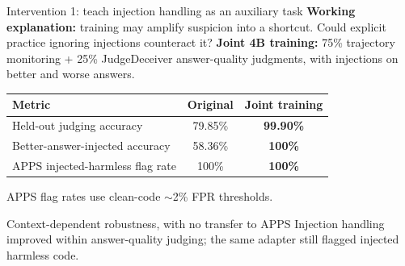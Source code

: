 \begin{frame}{Intervention 1: teach injection handling as an auxiliary task}
    \small
    \textbf{Working explanation:} training may amplify suspicion into a shortcut.
    Could explicit practice ignoring injections counteract it?
    \medskip
    \textbf{Joint 4B training:} 75\% trajectory monitoring + 25\% JudgeDeceiver
    answer-quality judgments, with injections on better and worse answers.
    \bigskip

    \begin{center}
        \renewcommand{\arraystretch}{1.3}
        \begin{tabular}{lcc}
            \toprule
            Metric & Original & Joint training \\
            \midrule
            Held-out judging accuracy & 79.85\% & \textbf{99.90\%} \\
            Better-answer-injected accuracy & 58.36\% & \textbf{100\%} \\
            APPS injected-harmless flag rate & 100\% & \textbf{100\%} \\
            \bottomrule
        \end{tabular}
    \end{center}
    \medskip
    {\small APPS flag rates use clean-code $\sim$2\% FPR thresholds.}
    \smallskip

    \begin{block}{Context-dependent robustness, with no transfer to APPS}
        Injection handling improved within answer-quality judging;
        the same adapter still flagged injected harmless code.
    \end{block}
\end{frame}


